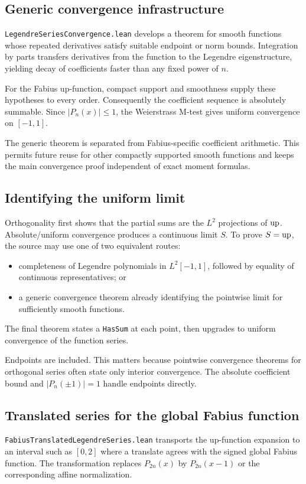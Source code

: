 \documentclass[11pt,oneside]{article}
\theoremstyle{definition}
\theoremstyle{remark}
\begin{document}
\subsection{Generic convergence infrastructure}
\nolinkurl{LegendreSeriesConvergence.lean} develops a theorem for smooth functions whose repeated derivatives satisfy suitable endpoint or norm bounds.  Integration by parts transfers derivatives from the function to the Legendre eigenstructure, yielding decay of coefficients faster than any fixed power of \(n\).

For the Fabius up-function, compact support and smoothness supply these hypotheses to every order.  Consequently the coefficient sequence is absolutely summable.  Since \(|P_n(x)|\leq1\), the Weierstrass M-test gives uniform convergence on \([-1,1]\).

The generic theorem is separated from Fabius-specific coefficient arithmetic.  This permits future reuse for other compactly supported smooth functions and keeps the main convergence proof independent of exact moment formulas.

\subsection{Identifying the uniform limit}
Orthogonality first shows that the partial sums are the \(L^2\) projections of \(\operatorname{up}\).  Absolute/uniform convergence produces a continuous limit \(S\).  To prove \(S=\operatorname{up}\), the source may use one of two equivalent routes:
\begin{itemize}
  \item completeness of Legendre polynomials in \(L^2[-1,1]\), followed by equality of continuous representatives; or
  \item a generic convergence theorem already identifying the pointwise limit for sufficiently smooth functions.
\end{itemize}
The final theorem states a \nolinkurl{HasSum} at each point, then upgrades to uniform convergence of the function series.

Endpoints are included.  This matters because pointwise convergence theorems for orthogonal series often state only interior convergence.  The absolute coefficient bound and \(|P_n(\pm1)|=1\) handle endpoints directly.

\subsection{Translated series for the global Fabius function}
\nolinkurl{FabiusTranslatedLegendreSeries.lean} transports the up-function expansion to an interval such as \([0,2]\) where a translate agrees with the signed global Fabius function.  The transformation replaces \(P_{2n}(x)\) by \(P_{2n}(x-1)\) or the corresponding affine normalization.
\end{document}
